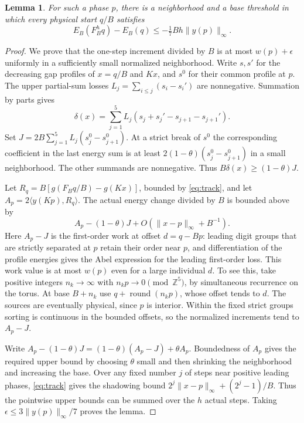 \documentclass[11pt,reqno]{amsart}
\newtheorem{lemma}[theorem]{Lemma}
\theoremstyle{remark}
\newcommand{\Z}{\mathbb Z}
\begin{document}
\begin{lemma}\label{lem:ordinary}
For such a phase \(p\), there is a neighborhood and a base threshold in which every physical start \(q/B\) satisfies
\[
 E_B(F_B^h q)-E_B(q)\le -\tfrac17 Bh\|y(p)\|_\infty.
\]
\end{lemma}
\begin{proof}
We prove that the one-step increment divided by \(B\) is at most \(w(p)+\epsilon\) uniformly in a sufficiently small normalized neighborhood. Write \(s,s'\) for the decreasing gap profiles of \(x=q/B\) and \(Kx\), and \(s^0\) for their common profile at \(p\). The upper partial-sum losses \(L_j=\sum_{i\le j}(s_i-s_i')\) are nonnegative. Summation by parts gives
\[
 \delta(x)=\sum_{j=1}^5 L_j(s_j+s_j'-s_{j+1}-s_{j+1}').
\]
Set \(J=2B\sum_{j=1}^5 L_j(s^0_j-s^0_{j+1})\). At a strict break of \(s^0\) the corresponding coefficient in the last energy sum is at least \(2(1-\theta)(s_j^0-s_{j+1}^0)\) in a small neighborhood. The other summands are nonnegative. Thus \(B\delta(x)\ge(1-\theta)J\).

Let \(R_q=B[g(F_Bq/B)-g(Kx)]\), bounded by \eqref{eq:track}, and let \(A_p=2\langle y(Kp),R_q\rangle\). The actual energy change divided by \(B\) is bounded above by
\[
 A_p-(1-\theta)J+O(\|x-p\|_\infty+B^{-1}).
\]
Here \(A_p-J\) is the first-order work at offset \(d=q-Bp\): leading digit groups that are strictly separated at \(p\) retain their order near \(p\), and differentiation of the profile energies gives the Abel expression for the leading first-order loss. This work value is at most \(w(p)\) even for a large individual \(d\). To see this, take positive integers \(n_k\to\infty\) with \(n_kp\to0\pmod{\Z^5}\), by simultaneous recurrence on the torus. At base \(B+n_k\) use \(q+\operatorname{round}(n_kp)\), whose offset tends to \(d\). The sources are eventually physical, since \(p\) is interior. Within the fixed strict groups sorting is continuous in the bounded offsets, so the normalized increments tend to \(A_p-J\).

Write \(A_p-(1-\theta)J=(1-\theta)(A_p-J)+\theta A_p\). Boundedness of \(A_p\) gives the required upper bound by choosing \(\theta\) small and then shrinking the neighborhood and increasing the base. Over any fixed number \(j\) of steps near positive leading phases, \eqref{eq:track} gives the shadowing bound \(2^j\|x-p\|_\infty+(2^j-1)/B\). Thus the pointwise upper bounds can be summed over the \(h\) actual steps. Taking \(\epsilon\le3\|y(p)\|_\infty/7\) proves the lemma.
\end{proof}
\end{document}
